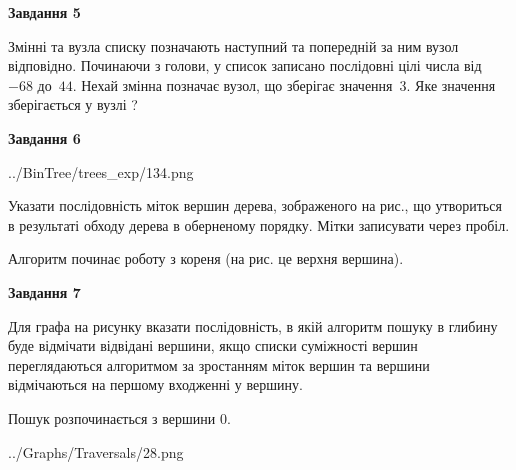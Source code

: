 \documentclass[12pt, ukrainian]{article}
\begin{document}
{\begin {large}
{\begin {center}\textbf{Завдання 5}\end {center}}\par
Змінні  та  вузла списку позначають наступний та попередній за ним вузол відповідно. Починаючи з голови, у список записано послідовні цілі числа від~$-68$ до~$44$. Нехай змінна  позначає вузол, що зберігає значення~$3$.
Яке значення зберігається у вузлі  ?\par
\newpage

{\begin {center}\textbf{Завдання 6}\end {center}}\par

\begin{center}
	{../BinTree/trees_exp/134.png}
\end{center}
Указати послідовність міток вершин дерева, зображеного на рис., що утвориться в результаті обходу дерева в оберненому порядку. Мітки записувати через пробіл.\par Алгоритм починає роботу з кореня (на рис. це верхня вершина).\par
\newpage

{\begin {center}\textbf{Завдання 7}\end {center}}\par
Для графа на рисунку вказати послідовність, в якій алгоритм пошуку в глибину буде відмічати відвідані вершини, якщо списки суміжності вершин переглядаються алгоритмом за зростанням міток вершин та вершини відмічаються на першому вход\-женні у вершину.\par
Пошук розпочинається з вершини 0.\par

\begin{center}
	{../Graphs/Traversals/28.png}
\end{center}\par
\newpage


\end{large}}
\end{document}
